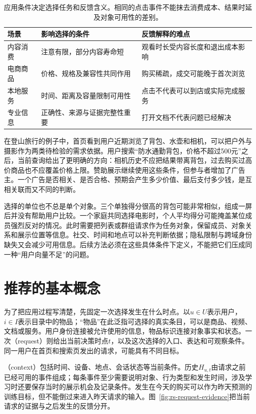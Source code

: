 \begin{table}[htbp]
  \centering
  \begin{tabularx}{\linewidth}{@{}lXX@{}}
    \toprule
    场景 & 影响选择的条件 & 反馈解释的难点 \\
    \midrule
    内容消费 & 注意有限，部分内容寿命短 & 观看时长受内容长度和退出成本影响 \\
    电商商品 & 价格、规格及兼容性共同作用 & 购买稀疏，成交可能晚于首次浏览 \\
    本地服务 & 时间、距离及容量限制可用性 & 点击不代表可以到店或实际完成服务 \\
    专业信息 & 正确性、来源与证据完整性重要 & 打开文档不代表问题已经解决 \\
    \bottomrule
  \end{tabularx}
  \caption{应用条件决定选择任务和反馈含义。相同的点击事件不能抹去消费成本、结果时延及对象可用性的差别。}
  \label{tab:rs-scenarios}
\end{table}

在登山旅行的例子中，首页看到用户近期浏览了背包、水壶和相机，可以把户外与摄影作为两类待检验的需求依据。用户搜索“防水通勤背包，价格不超过500元”之后，当前查询给出了更明确的方向：相机历史不应把结果带离背包，过去购买过高价商品也不应覆盖价格上限。赞助展示继续使用这些条件，但参与者增加了广告主。一个广告是否相关、是否合格、预期会产生多少价值、最后支付多少钱，是互相关联而又不同的判断。

选择的单位也不总是单个对象。三个单独得分很高的背包可能非常相似，组成一屏后并没有帮助用户比较。一个家庭共同选择电影时，个人平均得分可能掩盖某位成员强烈反对的情况。此时需要把列表或群组请求作为任务对象，保留成员、对象关系和展示位置等信息。社交、时间和地点可以补充判断依据；隐私限制与跨域身份缺失又会减少可用信息。后续方法必须在这些具体条件下定义，不能把它们压成同一种“用户向量不足”的问题。

\section{推荐的基本概念}
\label{sec:rs-concepts}

为了把应用过程写清楚，先固定一次选择发生在什么时点。以$u\in U$表示用户，$i\in I$表示目录中的物品；“物品”在此泛指可选择的真实条目，可以是商品、视频、文档或服务。用户身份连接被允许使用的信息，物品标识连接对象事实和状态。一次（request）则给出当前决策时点$t$，以及这次选择的入口、表达和可观察条件。同一用户在首页和搜索页发出的请求，可能具有不同目标。

（context）包括时间、设备、地点、会话状态等当前条件。历史$H_{u,t}$由请求之前已经可用的事件组成；每条事件至少需要说明对象、行为类型和发生时间，涉及学习时还要保存当时的展示机会及记录条件。发生在今天的购买可以作为昨天预测的训练目标，但不能倒过来进入昨天请求的输入。图~\ref{fig:rs-request-evidence}把当前请求的证据与之后发生的反馈分开。

